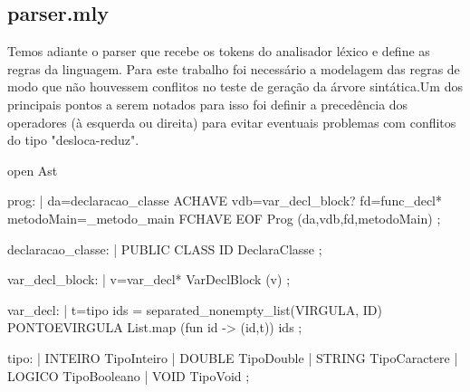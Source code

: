 \documentclass[12pt,a4paper,twoside]{report}
\begin{document}
\subsection{parser.mly}
Temos adiante o parser que recebe os tokens do analisador léxico e define as regras da linguagem. Para este trabalho foi necessário a modelagem das regras de modo que não houvessem conflitos no teste de geração da árvore sintática.Um dos principais pontos a serem notados para isso foi definir a precedência dos operadores (à esquerda ou direita) para evitar eventuais problemas com conflitos do tipo "desloca-reduz".
\begin{terminal}

  open Ast







   
prog:
    | da=declaracao_classe ACHAVE  vdb=var_decl_block? fd=func_decl* metodoMain=_metodo_main FCHAVE  EOF { Prog (da,vdb,fd,metodoMain) }
    ;
 

	
	
	
declaracao_classe:
    | PUBLIC CLASS ID { DeclaraClasse }
    ;

var_decl_block:
    |  v=var_decl* { VarDeclBlock (v) }
    ;

var_decl:
    | t=tipo ids = separated_nonempty_list(VIRGULA, ID)  PONTOEVIRGULA {  List.map (fun id -> (id,t)) ids }
    ;



tipo:
    | INTEIRO { TipoInteiro }
    | DOUBLE { TipoDouble }
    | STRING { TipoCaractere }
    | LOGICO { TipoBooleano }
    | VOID { TipoVoid }
    ;


\end{terminal}
\end{document}
